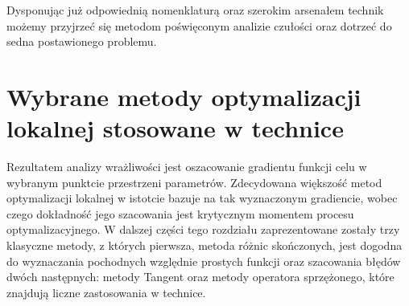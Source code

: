 \documentclass[12pt, twoside]{book}
\begin{document}
Dysponując już odpowiednią nomenklaturą oraz szerokim arsenałem technik możemy przyjrzeć się metodom poświęconym analizie czułości oraz dotrzeć do sedna postawionego problemu. 
\newpage
\chapter{Wybrane metody optymalizacji lokalnej stosowane w technice}
Rezultatem analizy wrażliwości jest oszacowanie gradientu funkcji celu w wybranym punktcie przestrzeni parametrów. Zdecydowana większość metod optymalizacji lokalnej w istotcie bazuje na tak wyznaczonym gradiencie, wobec czego dokładność jego szacowania jest krytycznym momentem procesu optymalizacyjnego. W dalszej części tego rozdziału zaprezentowane zostały trzy klasyczne metody, z których pierwsza, metoda różnic skończonych, jest dogodna do wyznaczania pochodnych względnie prostych funkcji oraz szacowania błędów dwóch następnych: metody Tangent oraz metody operatora sprzężonego, które znajdują liczne zastosowania w technice.
\end{document}
